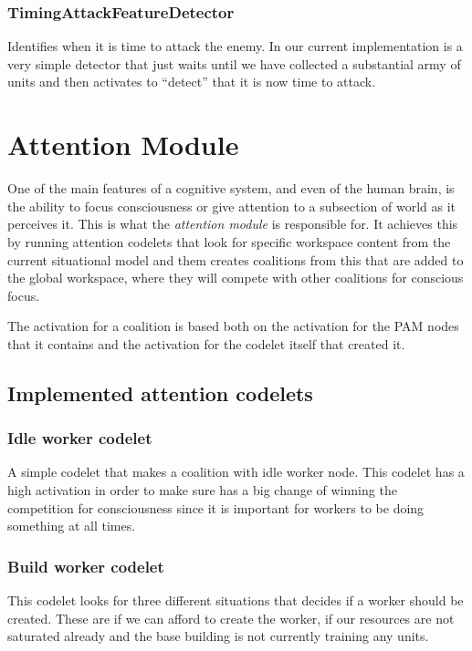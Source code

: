 \subsubsection{TimingAttackFeatureDetector}
Identifies when it is time to attack the enemy. In our current implementation is a very simple detector that just waits until we have collected a substantial army of units and then activates to ``detect'' that it is now time to attack.

\section{Attention Module}
\label{sec:attention}
One of the main features of a cognitive system, and even of the human brain, is the ability to focus consciousness or give attention to a subsection of world as it perceives it. This is what the {\em attention module} is responsible for. It achieves this by running attention codelets that look for specific workspace content from the current situational model and them creates coalitions from this that are added to the global workspace, where they will compete with other coalitions for conscious focus.

The activation for a coalition is based both on the activation for the PAM nodes that it contains and the activation for the codelet itself that created it.

\subsection{Implemented attention codelets}
\subsubsection{Idle worker codelet}
A simple codelet that makes a coalition with idle worker node. This codelet has a high activation in order to make sure has a big change of winning the competition for consciousness since it is important for workers to be doing something at all times.

\subsubsection{Build worker codelet}
This codelet looks for three different situations that decides if a worker should be created. These are if we can afford to create the worker, if our resources are not saturated already and the base building is not currently training any units.

